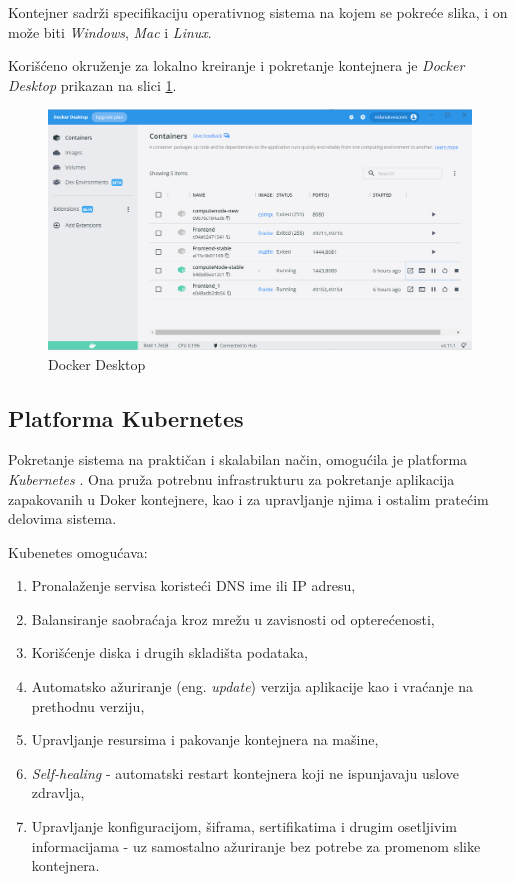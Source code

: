 \documentclass[12pt,oneside]{memoir}
\begin{document}
Kontejner sadrži specifikaciju operativnog sistema na kojem se pokreće slika, i on može biti \emph{Windows}, \emph{Mac} i \emph{Linux}.

Korišćeno okruženje za lokalno kreiranje i pokretanje kontejnera je \emph{Docker Desktop} prikazan na slici \ref{fig:dockerdesktop}.

\begin{figure}[!ht]
  \centering
  \includegraphics[width=1.0\textwidth]{./images/docker_desktop.png}
  \caption{Docker Desktop}
  \label{fig:dockerdesktop}
\end{figure}

\subsection{Platforma Kubernetes}
\label{subs:kubernetes_platform}

Pokretanje sistema na praktičan i skalabilan način, omogućila je platforma \emph{Kubernetes} \cite{Kubernetes}. Ona pruža potrebnu infrastrukturu za pokretanje aplikacija zapakovanih u Doker kontejnere, kao i za upravljanje njima i ostalim pratećim delovima sistema.

Kubenetes omogućava:
\begin{enumerate}
\item Pronalaženje servisa koristeći DNS ime ili IP adresu,
\item Balansiranje saobraćaja kroz mrežu u zavisnosti od opterećenosti,
\item Korišćenje diska i drugih skladišta podataka,
\item Automatsko ažuriranje (eng. \emph{update}) verzija aplikacije kao i vraćanje na prethodnu verziju,
\item Upravljanje resursima i pakovanje kontejnera na mašine,
\item \emph{Self-healing} - automatski restart kontejnera koji ne ispunjavaju uslove zdravlja,
\item Upravljanje konfiguracijom, šiframa, sertifikatima i drugim osetljivim informacijama - uz samostalno ažuriranje bez potrebe za promenom slike kontejnera.
\end{enumerate}
\end{document}
